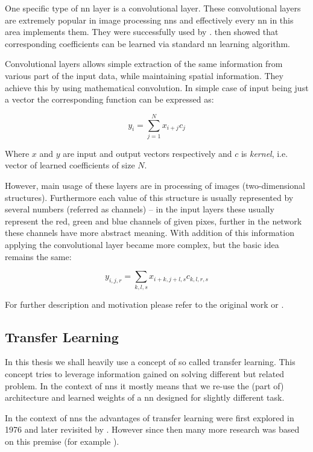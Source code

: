 One specific type of \gls{nn} layer is a convolutional layer. These convolutional layers
are extremely popular in image processing \glspl{nn} and effectively every
\gls{nn} in this area implements them. They were successfully used by
\cite{conv}. \cite{convbackprop} then showed that corresponding coefficients
can be learned via standard \gls{nn} learning algorithm.

Convolutional layers allows simple extraction of the same information from
various part of the input data, while maintaining spatial information. They
achieve this by using mathematical convolution. In simple case of input being
just a vector the corresponding function can be expressed as:

$$y_i = \sum_{j=1}^N x_{i+j} c_j$$

Where $x$ and $y$ are input and output vectors respectively and $c$ is
\emph{kernel}, i.e. vector of learned coefficients of size $N$.

However, main usage of these layers are in processing of images
(two-dimensional structures). Furthermore each value of this structure
is usually represented by several numbers (referred as channels) -- in the
input layers these usually represent the red, green and blue channels of
given pixes, further in the network these channels have more abstract
meaning. With addition of this information applying the convolutional
layer became more complex, but the basic idea remains the same:

$$y_{i, j, r} = \sum_{k, l, s} x_{i+k, j+l, s} c_{k, l, r, s}$$

For further description and motivation please refer to the original work
or \cite{deeplearningbook}.

\subsection{Transfer Learning}

\label{ssec:transfer_learning}

In this thesis we shall heavily use a concept of so called transfer learning.
This concept tries to leverage information gained on solving different but
related problem. In the context of \glspl{nn} it mostly means that we re-use
the (part of) architecture and learned weights of a \gls{nn} designed for
slightly different task.

In the context of \glspl{nn} the advantages of transfer learning were first
explored in 1976 and later revisited by \cite{transferreviewed}. However since
then many more research was based on this premise (for example
\cite{transferlearning}).

